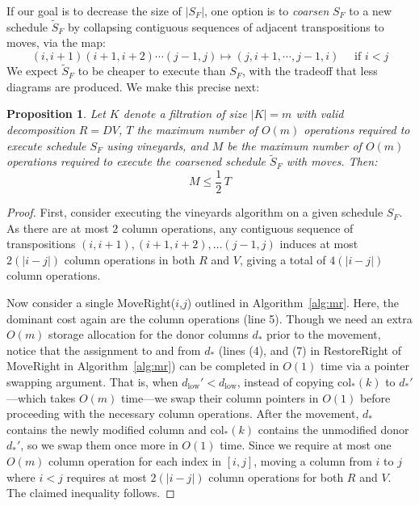 \documentclass[sn-mathphys]{sn-jnl}
\newtheorem{proposition}{Proposition}
\begin{document}
If our goal is to decrease the size of $\lvert S_F \rvert$, one option is to \emph{coarsen} $S_F$ to a new schedule $\widetilde{S}_F$ by collapsing contiguous sequences of adjacent transpositions to moves, via the map:
\begin{equation}\label{eq:tr_to_mv}
	 (i, i+1)(i+1, i+2)\cdots(j-1, j) \mapsto (j, i+1, \cdots, j-1, i)  \quad \text{ if } i < j
\end{equation}
We expect $\widetilde{S}_F$ to be cheaper to execute than $S_F$, with the tradeoff  that less diagrams are produced.
We make this precise next:
\begin{proposition}\label{prop:factor2}
	Let $K$ denote a filtration of size $\lvert K \rvert = m$ with valid decomposition $R = D V$, $T$ the maximum number of $O(m)$ operations required to execute schedule $S_F$ using vineyards, and $M$ be the maximum number of $O(m)$ operations required to execute the coarsened schedule $\widetilde{S}_F$ with moves. Then:
	$$ M \leq {\textstyle \frac{1}{2} \, T} $$ 
\end{proposition}
\begin{proof} \normalsize
First, consider executing the vineyards algorithm on a given schedule $S_F$. As there are at most $2$ column operations, any contiguous sequence of transpositions $(i,i+1), (i+1,i+2), \ldots (j-1,j)$ induces at most $2(\lvert i - j \rvert)$ column operations in both $R$ and $V$, giving a total of $4(\lvert i - j \rvert)$ column operations.

Now consider a single MoveRight($i$,$j$) outlined in Algorithm~\ref{alg:mr}. Here, the dominant cost again are the column operations (line 5). 
Though we need an extra $O(m)$ storage allocation for the donor columns $d_\ast$ prior to the movement, notice that the assignment to and from $d_\ast$ (lines (4), and (7) in RestoreRight of MoveRight in Algorithm~\ref{alg:mr}) can be completed in $O(1)$ time via a pointer swapping argument. That is, when $d_\mathrm{low}' < d_\mathrm{low}$, instead of copying $\mathrm{col}_\ast(k)$ to $d_\ast'$---which takes $O(m)$ time---we swap their column pointers in $O(1)$ before proceeding with the necessary column operations. After the movement, $d_\ast$ contains the newly modified column and $\mathrm{col}_\ast(k)$ contains the unmodified donor $d_\ast'$, so we swap them once more in $O(1)$ time. 
Since we require at most one $O(m)$ column operation for each index in $[i, j]$, moving a column from $i$ to $j$ where $i < j$ requires at most $2(\lvert i - j \rvert)$ column operations for both $R$ and $V$. The claimed inequality follows. 
\end{proof}
\end{document}
